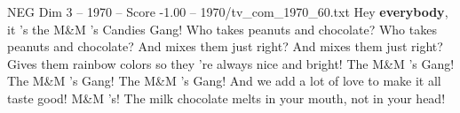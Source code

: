 \begin{textsample}{NEG Dim 3 – 1970 – Score -1.00 – 1970/tv\_com\_1970\_60.txt}  \label{ex:f3_neg_063}
Hey \textbf{everybody}, it 's the M\&M 's Candies Gang!
Who takes peanuts and chocolate?
Who takes peanuts and chocolate?
And mixes them just right?
And mixes them just right?
Gives them rainbow colors so they 're always nice and bright!
The M\&M 's Gang!
The M\&M 's Gang!
The M\&M 's Gang!
And we add a lot of love to make it all taste good!
M\&M 's!
The milk chocolate melts in your mouth, not in your head!

\end{textsample}
